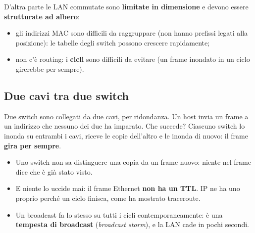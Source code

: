 D'altra parte le LAN commutate sono \textbf{limitate in dimensione} e devono essere \textbf{strutturate ad albero}:

\begin{itemize}
    \item gli indirizzi MAC sono difficili da raggruppare (non hanno prefissi legati alla posizione): le tabelle degli switch possono crescere rapidamente;
    \item non c'è routing: i \textbf{cicli} sono difficili da evitare (un frame inondato in un ciclo girerebbe per sempre).
\end{itemize}

\subsection{Due cavi tra due switch}

Due switch sono collegati da due cavi, per ridondanza. Un host invia un frame a un indirizzo che nessuno dei due ha imparato. Che
succede? Ciascuno switch lo inonda su entrambi i cavi, riceve le copie dell'altro e le inonda di nuovo: il frame \textbf{gira per
sempre}.

\begin{itemize}
    \item Uno switch non sa distinguere una copia da un frame nuovo: niente nel frame dice che è già stato visto.
    \item E niente lo uccide mai: il frame Ethernet \textbf{non ha un TTL}. IP ne ha uno proprio perché un ciclo finisca, come ha
          mostrato traceroute.
    \item Un broadcast fa lo stesso su tutti i cicli contemporaneamente: è una \textbf{tempesta di broadcast} (\emph{broadcast
          storm}), e la LAN cade in pochi secondi.
\end{itemize}


